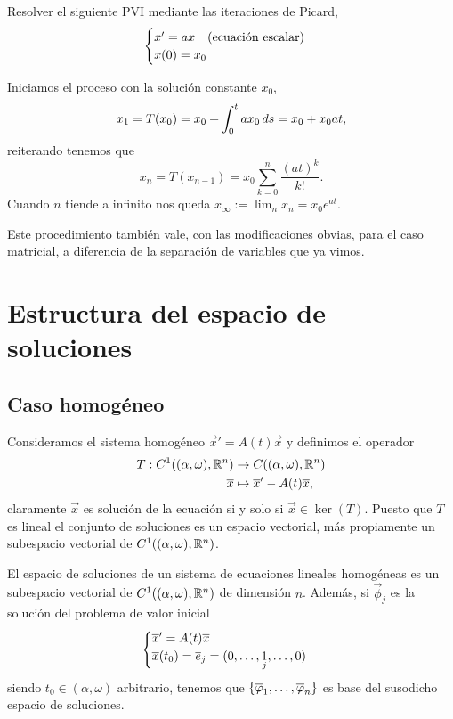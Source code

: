 \documentclass[../ecuaciones_diferenciales.tex]{subfiles}
\begin{document}
\begin{example}
	Resolver el siguiente PVI mediante las iteraciones de Picard,
	\[\begin{cases}x' = ax \quad \text{(ecuación escalar)} \\
			x(0) = x_0\end{cases}\]
\end{example}

\begin{solution}
	Iniciamos el proceso con la solución constante \(x_0\),
	\[x_1 = T(x_0) = x_0 + \int_0^t a x_0 \mathop{d\!} s = x_0 + x_0 a t,\]
	reiterando tenemos que
	\[x_n = T(x_{n - 1}) = x_0 \sum_{k = 0}^n \frac{(at)^k}{k!}.\]
	Cuando \(n\) tiende a infinito nos queda 
	\(x_\infty := \lim_n x_n = x_0 e^{at}\).
\end{solution}

\begin{remark}
	Este procedimiento también vale, con las modificaciones obvias, para el caso
	matricial, a diferencia de la separación de variables que ya vimos.
\end{remark}

\section{Estructura del espacio de soluciones}

\subsection{Caso homogéneo}

Consideramos el sistema homogéneo \(\vec{x}' = A(t) \vec{x}\) y definimos el
operador 
\begin{align*}
	T : C^1((\alpha, \omega), \mathbb{R}^n) & \to C((\alpha, \omega), \mathbb{R}^n) \\
							\overline{x} & \mapsto \overline{x}' - A(t)\overline{x},
\end{align*}
claramente \(\vec{x}\) es solución de la ecuación si y solo si 
\(\vec{x} \in \ker(T)\).
Puesto que \(T\) es lineal el conjunto de soluciones es un espacio vectorial,
más propiamente un subespacio vectorial de \(C^1((\alpha, \omega), \mathbb{R}^n)\).

\begin{theorem}
	El espacio de soluciones de un sistema de ecuaciones lineales homogéneas es
	un subespacio vectorial de \(C^1((\alpha, \omega), \mathbb{R}^n)\) de dimensión
	\(n\). Además, si \(\vec{\phi}_j\) es la solución del problema de valor 
	inicial
	\[\begin{cases}
		\overline{x}' = A(t)\overline{x} \\
		\overline{x}(t_0) = \overline{e}_j = (0, \dots, \underset{j}{1}, \dots, 0)\end{cases}\]
	siendo \(t_0 \in (\alpha, \omega)\) arbitrario, tenemos que
	\(\set{\vec{\phi}_1, \dots, \vec{\phi}_n}\) es base del susodicho 
	espacio de soluciones.
\end{theorem}
\end{document}

